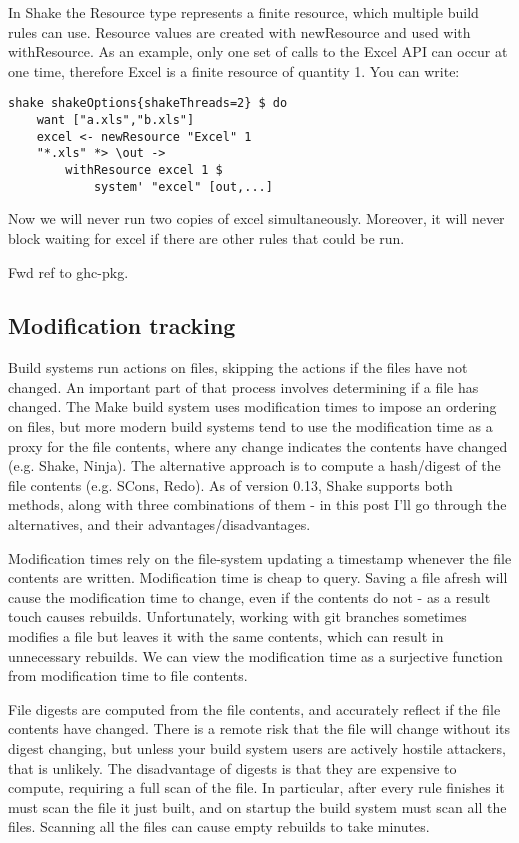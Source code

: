 In Shake the Resource type represents a finite resource, which multiple build rules can use. Resource values are created with newResource and used with withResource. As an example, only one set of calls to the Excel API can occur at one time, therefore Excel is a finite resource of quantity 1. You can write:

\begin{lstlisting}
shake shakeOptions{shakeThreads=2} $ do
    want ["a.xls","b.xls"]
    excel <- newResource "Excel" 1
    "*.xls" *> \out ->
        withResource excel 1 $
            system' "excel" [out,...]
\end{lstlisting}

Now we will never run two copies of excel simultaneously. Moreover, it will never block waiting for excel if there are other rules that could be run.

Fwd ref to ghc-pkg.

\subsection{Modification tracking}

Build systems run actions on files, skipping the actions if the files have not changed. An important part of that process involves determining if a file has changed. The Make build system uses modification times to impose an ordering on files, but more modern build systems tend to use the modification time as a proxy for the file contents, where any change indicates the contents have changed (e.g. Shake, Ninja). The alternative approach is to compute a hash/digest of the file contents (e.g. SCons, Redo). As of version 0.13, Shake supports both methods, along with three combinations of them - in this post I'll go through the alternatives, and their advantages/disadvantages.

Modification times rely on the file-system updating a timestamp whenever the file contents are written. Modification time is cheap to query. Saving a file afresh will cause the modification time to change, even if the contents do not - as a result touch causes rebuilds. Unfortunately, working with git branches sometimes modifies a file but leaves it with the same contents, which can result in unnecessary rebuilds. We can view the modification time as a surjective function from modification time to file contents.

File digests are computed from the file contents, and accurately reflect if the file contents have changed. There is a remote risk that the file will change without its digest changing, but unless your build system users are actively hostile attackers, that is unlikely. The disadvantage of digests is that they are expensive to compute, requiring a full scan of the file. In particular, after every rule finishes it must scan the file it just built, and on startup the build system must scan all the files. Scanning all the files can cause empty rebuilds to take minutes.


